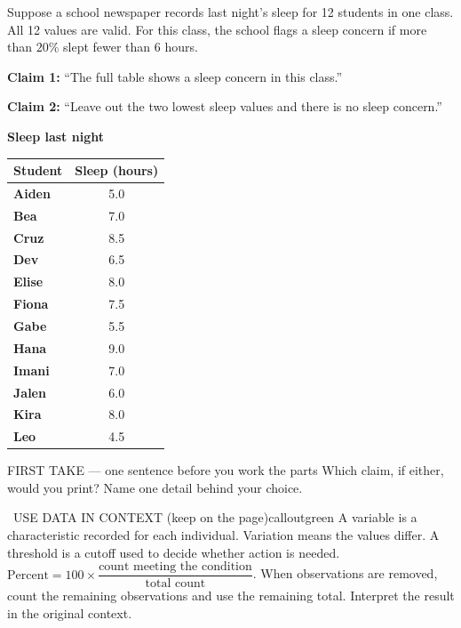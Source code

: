 \documentclass[11pt]{article}
\begin{document}
Suppose a school newspaper records last night's sleep for 12 students in one class. All 12 values are valid. For this class, the school flags a sleep concern if more than $20\%$ slept fewer than 6 hours.\par\smallskip \textbf{Claim 1:} ``The full table shows a sleep concern in this class.''\par \textbf{Claim 2:} ``Leave out the two lowest sleep values and there is no sleep concern.''\par
\begin{center}
\textbf{Sleep last night}\par\smallskip
\begin{tabular}{|l|c|}
\hline
\textbf{Student} & \textbf{Sleep (hours)} \\ \hline
\textbf{Aiden} & 5.0 \\ \hline
\textbf{Bea} & 7.0 \\ \hline
\textbf{Cruz} & 8.5 \\ \hline
\textbf{Dev} & 6.5 \\ \hline
\textbf{Elise} & 8.0 \\ \hline
\textbf{Fiona} & 7.5 \\ \hline
\textbf{Gabe} & 5.5 \\ \hline
\textbf{Hana} & 9.0 \\ \hline
\textbf{Imani} & 7.0 \\ \hline
\textbf{Jalen} & 6.0 \\ \hline
\textbf{Kira} & 8.0 \\ \hline
\textbf{Leo} & 4.5 \\ \hline
\end{tabular}
\end{center}
\begin{firsttakebox}{FIRST TAKE --- one sentence before you work the parts}
Which claim, if either, would you print? Name one detail behind your choice.\par
{}
\end{firsttakebox}

\begin{callout}{\IconBook\ USE DATA IN CONTEXT (keep on the page)}{calloutgreen}
A variable is a characteristic recorded for each individual. Variation means the values differ. A threshold is a cutoff used to decide whether action is needed. $\text{Percent}=100\times\dfrac{\text{count meeting the condition}}{\text{total count}}$. When observations are removed, count the remaining observations and use the remaining total. Interpret the result in the original context.
\end{callout}
\end{document}
